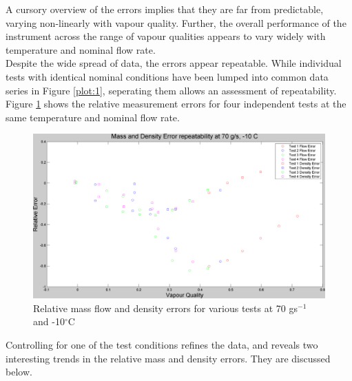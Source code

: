 \documentclass{report}
\begin{document}
A cursory overview of the errors implies that they are far from predictable, varying non-linearly with vapour quality. Further, the overall performance of the instrument across the range of vapour qualities appears to vary widely with temperature and nominal flow rate.\\
Despite the wide spread of data, the errors appear repeatable. While individual tests with identical nominal conditions have been lumped into common data series in Figure \ref{plot:1}, seperating them allows an assessment of repeatability. Figure \ref{plot:11} shows the relative measurement errors for four independent tests at the same temperature and nominal flow rate. 
\begin{figure}
\includegraphics[width=\textwidth]{plots/fig11}
\caption{Relative mass flow and density errors for various tests at 70 gs$^{-1}$ and -10$^\circ$C}
\label{plot:11}
\end{figure}
Controlling for one of the test conditions refines the data, and reveals two interesting trends in the relative mass and density errors. They are discussed below.
\FloatBarrier
\end{document}
